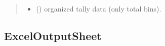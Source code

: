 \documentclass[letterpaper,10pt,english]{sphinxmanual}
\begin{document}
\begin{fulllineitems}
\begin{fulllineitems}
\begin{quote}
\begin{description}
\begin{itemize}
\item {} 
 () \textendash{} organized tally data (only total bins).

\end{itemize}


\end{description}\end{quote}

\end{fulllineitems}


\end{fulllineitems}



\subsection{ExcelOutputSheet}
\label{\detokenize{api/postprocessing:exceloutputsheet}}
\end{document}
